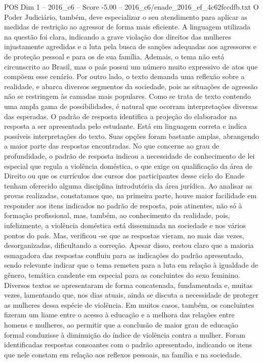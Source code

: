 \begin{textsample}{POS Dim 1 – 2016\_c6 – Score -5.00 – 2016\_c6/enade\_2016\_ef\_4c62fccdfb.txt}
O Poder Judiciário, também, deve especializar o seu atendimento para aplicar as medidas de restrição ao agressor de forma mais eficiente.
A linguagem utilizada na questão foi clara, indicando a grave violação dos direitos das mulheres injustamente agredidas e a luta pela busca de sanções adequadas aos agressores e de proteção pessoal e para os de sua família.
Ademais, o tema não está circunscrito ao Brasil, mas o país possui um número muito expressivo de atos que compõem esse cenário.
Por outro lado, o texto demanda uma reflexão sobre a realidade, e abarca diversos segmentos da sociedade, pois as situações de agressão não se restringem às camadas mais populares.
Como se trata de texto contendo uma ampla gama de possibilidades, é natural que ocorram interpretações diversas das esperadas.
O padrão de resposta identifica a projeção do elaborador na resposta a ser apresentada pelo estudante.
Está em linguagem correta e indica possíveis interpretações do texto.
Suas opções foram bastante amplas, abrangendo a maior parte das respostas encontradas.
No que concerne ao grau de profundidade, o padrão de resposta indicou a necessidade de conhecimento de lei especial que regula a violência doméstica, o que exige ou qualificação da área de Direito ou que os currículos dos cursos dos participantes desse ciclo do Enade tenham oferecido alguma disciplina introdutória da área jurídica.
Ao analisar as provas realizadas, constatamos que, na primeira parte, houve maior facilidade em responder aos itens indicados no padrão de resposta, pois atinentes, não só à formação profissional, mas, também, ao conhecimento da realidade, pois, infelizmente, a violência doméstica está disseminada na sociedade e nos vários pontos do país.
Mas, verificou -se que as respostas vieram, no mais das vezes, desorganizadas, dificultando a correção.
Apesar disso, restou claro que a maioria esmagadora das respostas confluiu para as indicações do padrão apresentado, sendo relevante indicar que o tema remeteu para a luta em relação à igualdade de gênero, temática candente em especial para as concluintes do sexo feminino.
Diversos textos se apresentaram de forma concatenada, fundamentada e, muitas vezes, lamentando que, nos dias atuais, ainda se discuta a necessidade de proteger as mulheres dessa espécie de violência.
Em muitos casos, também, os concluintes fizeram um liame entre o acesso à educação e a melhora das relações entre homens e mulheres, ao permitir que a conclusão de maior grau de educação formal conduzisse à diminuição do índice de violência contra a mulher.
Foram identificadas respostas consoantes com o padrão apresentado, indicando os itens que nele constam em relação aos reflexos pessoais, na família e na sociedade.

\end{textsample}
